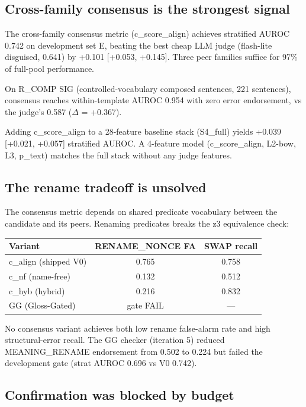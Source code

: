 \documentclass[11pt,letterpaper]{article}
\begin{document}
\subsection{Cross-family consensus is the strongest signal}

The cross-family consensus metric (c\_score\_align) achieves stratified AUROC 0.742 on development set E, beating the best cheap LLM judge (flash-lite disguised, 0.641) by +0.101 [+0.053, +0.145]. Three peer families suffice for 97\% of full-pool performance.

On R\_COMP SIG (controlled-vocabulary composed sentences, 221 sentences), consensus reaches within-template AUROC 0.954 with zero error endorsement, vs the judge's 0.587 ($\Delta$ = +0.367).

Adding c\_score\_align to a 28-feature baseline stack (S4\_full) yields +0.039 [+0.021, +0.057] stratified AUROC. A 4-feature model (c\_score\_align, L2-bow, L3, p\_text) matches the full stack without any judge features.

\subsection{The rename tradeoff is unsolved}

The consensus metric depends on shared predicate vocabulary between the candidate and its peers. Renaming predicates breaks the z3 equivalence check:

\begin{center}
\begin{tabular}{lcc}
\toprule
Variant & RENAME\_NONCE FA & SWAP recall \\
\midrule
c\_align (shipped V0) & 0.765 & 0.758 \\
c\_nf (name-free) & 0.132 & 0.512 \\
c\_hyb (hybrid) & 0.216 & 0.832 \\
GG (Gloss-Gated) & gate FAIL & --- \\
\bottomrule
\end{tabular}
\end{center}

No consensus variant achieves both low rename false-alarm rate and high structural-error recall. The GG checker (iteration 5) reduced MEANING\_RENAME endorsement from 0.502 to 0.224 but failed the development gate (strat AUROC 0.696 vs V0 0.742).

\subsection{Confirmation was blocked by budget}
\end{document}
